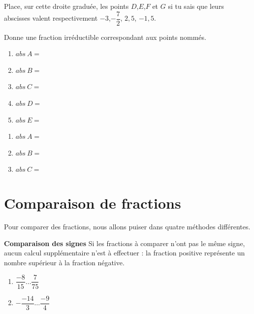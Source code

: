 \documentclass[../../syllabus_2.tex]{subfiles}
\begin{document}
\begin{exercise}
  Place, sur cette droite graduée, les points $D$,$E$,$F$ et $G$ si tu sais que leurs abscisses valent respectivement $-3$,$-\dfrac{7}{2}$, $2,5$, $-1,5$.
  \begin{center}
    
  \end{center}
\end{exercise}

\begin{exercise}
  Donne une fraction irréductible correspondant aux points nommés.
  \begin{center}
    
  \end{center}
  \begin{enumerate}[cols=5]
    \item $abs~A =$
    \item $abs~B =$
    \item $abs~C =$
    \item $abs~D =$
    \item $abs~E =$
  \end{enumerate}
  \begin{center}
    
  \end{center}
  \enlargethispage{2\baselineskip}
  \begin{enumerate}[cols=3]
    \item $abs~A =$
    \item $abs~B =$
    \item $abs~C = $
  \end{enumerate}
\end{exercise}

\newpage
\section{Comparaison de fractions}

Pour comparer des fractions, nous allons puiser dans quatre méthodes différentes.
\vfill

\textbf{Comparaison des signes}
Si les fractions à comparer n'ont pas le même signe, aucun calcul supplémentaire n'est à effectuer : la fraction positive représente un nombre supérieur à la fraction négative.

\exemples
\begin{enumerate}[cols=2]
  \item $\dfrac{-8}{15} \ldots \dfrac{7}{75}$
  \item $-\dfrac{-14}{3} \ldots \dfrac{-9}{4}$
\end{enumerate}
\vfill
\end{document}
